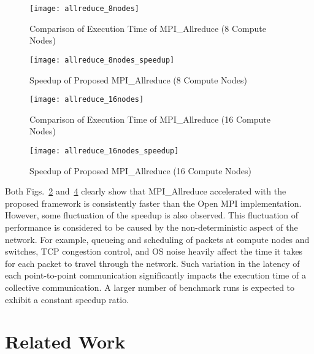 \begin{figure}
    \centering
    \texttt{[image: allreduce\_8nodes]}
    \caption{Comparison of Execution Time of MPI\_Allreduce (8 Compute Nodes)}%
    \label{fig:evaluation-8nodes}
\end{figure}

\begin{figure}
    \centering
    \texttt{[image: allreduce\_8nodes\_speedup]}
    \caption{Speedup of Proposed MPI\_Allreduce (8 Compute Nodes)}%
    \label{fig:evaluation-8nodes-normalized}
\end{figure}

\begin{figure}
    \centering
    \texttt{[image: allreduce\_16nodes]}
    \caption{Comparison of Execution Time of MPI\_Allreduce (16 Compute Nodes)}%
    \label{fig:evaluation-16nodes}
\end{figure}

\begin{figure}
    \centering
    \texttt{[image: allreduce\_16nodes\_speedup]}
    \caption{Speedup of Proposed MPI\_Allreduce (16 Compute Nodes)}%
    \label{fig:evaluation-16nodes-normalized}
\end{figure}

Both Figs.~\ref{fig:evaluation-8nodes-normalized}
and~\ref{fig:evaluation-16nodes-normalized} clearly show that MPI\_Allreduce
accelerated with the proposed framework is consistently faster than the Open
MPI implementation. However, some fluctuation of the speedup is also observed.
This fluctuation of performance is considered to be caused by the
non-deterministic aspect of the network. For example, queueing and scheduling
of packets at compute nodes and switches, TCP congestion control, and OS noise
heavily affect the time it takes for each packet to travel through the
network. Such variation in the latency of each point-to-point communication
significantly impacts the execution time of a collective communication. A
larger number of benchmark runs is expected to exhibit a constant speedup
ratio.

\section{Related Work}\label{sec:iii-related-work}

